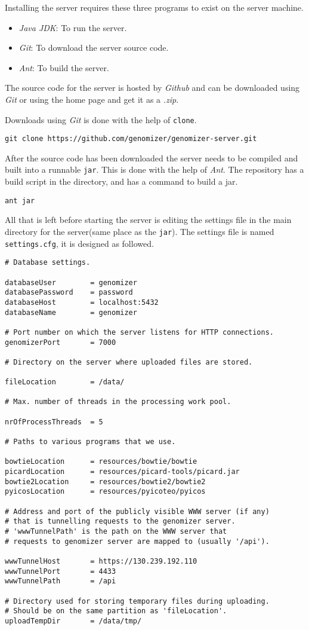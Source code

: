 Installing the server requires these three programs to exist on the server machine.
\begin{itemize}
	\item \textit{Java JDK}: To run the server.
	\item \textit{Git}: To download the server source code.
	\item \textit{Ant}: To build the server.
\end{itemize}

The source code for the server is hosted by \textit{Github} and can be downloaded using \textit{Git} or using the home page and get it as a \textit{.zip}. 

Downloads using \textit{Git} is done with the help of \texttt{clone}.
\begin{verbatim}
git clone https://github.com/genomizer/genomizer-server.git
\end{verbatim}

After the source code has been downloaded the server needs to be compiled and built into a runnable \texttt{jar}. This is done with the help of \textit{Ant}. The repository has a build script in the directory, and has a command to build a jar.
\begin{verbatim}
ant jar
\end{verbatim}

All that is left before starting the server is editing the settings file in the main directory for the server(same place as the \texttt{jar}). The settings file is named \texttt{settings.cfg}, it is designed as followed.

\begin{verbatim}
# Database settings.

databaseUser        = genomizer
databasePassword    = password
databaseHost        = localhost:5432
databaseName        = genomizer

# Port number on which the server listens for HTTP connections.
genomizerPort       = 7000

# Directory on the server where uploaded files are stored.

fileLocation        = /data/

# Max. number of threads in the processing work pool.

nrOfProcessThreads  = 5

# Paths to various programs that we use.

bowtieLocation      = resources/bowtie/bowtie
picardLocation      = resources/picard-tools/picard.jar
bowtie2Location     = resources/bowtie2/bowtie2
pyicosLocation      = resources/pyicoteo/pyicos

# Address and port of the publicly visible WWW server (if any)
# that is tunnelling requests to the genomizer server.
# 'wwwTunnelPath' is the path on the WWW server that
# requests to genomizer server are mapped to (usually '/api').

wwwTunnelHost       = https://130.239.192.110
wwwTunnelPort       = 4433
wwwTunnelPath       = /api

# Directory used for storing temporary files during uploading.
# Should be on the same partition as 'fileLocation'.
uploadTempDir       = /data/tmp/
\end{verbatim}

